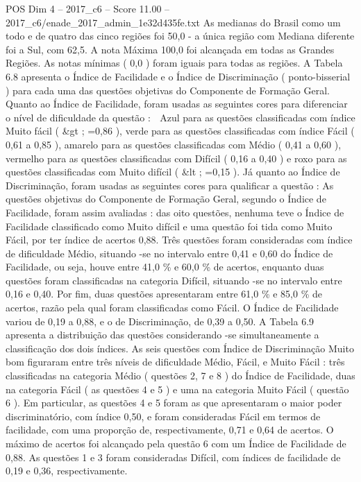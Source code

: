 \begin{textsample}{POS Dim 4 – 2017\_c6 – Score 11.00 – 2017\_c6/enade\_2017\_admin\_1e32d435fe.txt}
As medianas do Brasil como um todo e de quatro das cinco regiões foi 50,0 - a única região com Mediana diferente foi a Sul, com 62,5.
A nota Máxima 100,0 foi alcançada em todas as Grandes Regiões.
As notas mínimas ( 0,0 ) foram iguais para todas as regiões.
A Tabela 6.8 apresenta o Índice de Facilidade e o Índice de Discriminação ( ponto-bisserial ) para cada uma das questões objetivas do Componente de Formação Geral.
Quanto ao Índice de Facilidade, foram usadas as seguintes cores para diferenciar o nível de dificuldade da questão :  Azul para as questões classificadas com índice Muito fácil ( \&gt ; =0,86 ), verde para as questões classificadas com índice Fácil ( 0,61 a 0,85 ), amarelo para as questões classificadas com Médio ( 0,41 a 0,60 ), vermelho para as questões classificadas com Difícil ( 0,16 a 0,40 ) e roxo para as questões classificadas com Muito difícil ( \&lt ; =0,15 ).
Já quanto ao Índice de Discriminação, foram usadas as seguintes cores para qualificar a questão : As questões objetivas do Componente de Formação Geral, segundo o Índice de Facilidade, foram assim avaliadas : das oito questões, nenhuma teve o Índice de Facilidade classificado como Muito difícil e uma questão foi tida como Muito Fácil, por ter índice de acertos 0,88.
Três questões foram consideradas com índice de dificuldade Médio, situando -se no intervalo entre 0,41 e 0,60 do Índice de Facilidade, ou seja, houve entre 41,0 \% e 60,0 \% de acertos, enquanto duas questões foram classificadas na categoria Difícil, situando -se no intervalo entre 0,16 e 0,40.
Por fim, duas questões apresentaram entre 61,0 \% e 85,0 \% de acertos, razão pela qual foram classificadas como Fácil.
O Índice de Facilidade variou de 0,19 a 0,88, e o de Discriminação, de 0,39 a 0,50.
A Tabela 6.9 apresenta a distribuição das questões considerando -se simultaneamente a classificação dos dois índices.
As seis questões com Índice de Discriminação Muito bom figuraram entre três níveis de dificuldade Médio, Fácil, e Muito Fácil : três classificadas na categoria Médio ( questões 2, 7 e 8 ) do Índice de Facilidade, duas na categoria Fácil ( as questões 4 e 5 ) e uma na categoria Muito Fácil ( questão 6 ).
Em particular, as questões 4 e 5 foram as que apresentaram o maior poder discriminatório, com índice 0,50, e foram consideradas Fácil em termos de facilidade, com uma proporção de, respectivamente, 0,71 e 0,64 de acertos.
O máximo de acertos foi alcançado pela questão 6 com um Índice de Facilidade de 0,88.
As questões 1 e 3 foram consideradas Difícil, com índices de facilidade de 0,19 e 0,36, respectivamente.

\end{textsample}
